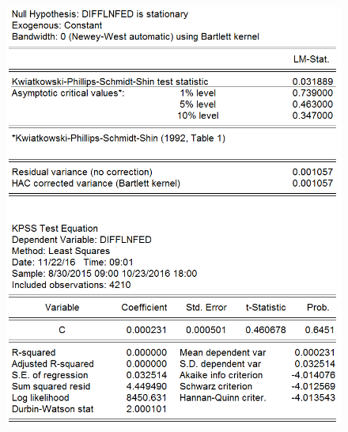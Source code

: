 \documentclass[11pt]{report}
\begin{document}
\begin{figure}[!h]
\begin{minipage}[c]{.46\linewidth}
\includegraphics[scale=0.5]{Appendix/chap2/11}
\end{minipage} \hfill
\end{figure}
\end{document}
